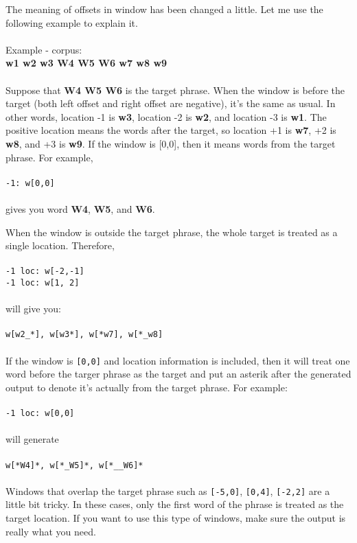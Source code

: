 \documentclass[11pt]{article}
\begin{document}
The meaning of offsets in window has been changed a little.  Let me use the 
following example to explain it. \\ \\
%
Example - corpus: \\ 
{\bf w1 w2 w3 W4 W5 W6 w7 w8 w9} \\ \\ 
%
Suppose that {\bf W4 W5 W6} is the target phrase.  When the window is before 
the target (both left offset and right offset are negative), it's the same as 
usual.  In other words, location -1 is {\bf w3}, location -2 is {\bf w2}, and 
location -3 is {\bf w1}.  The positive location means the words after the 
target, so location +1 is {\bf w7}, +2 is {\bf w8}, and +3 is {\bf w9}.  If the 
window is [0,0], then it means words from the target phrase.  For example, \\ \\
%
{\tt -1: w[0,0]} \\ \\
gives you word {\bf W4}, {\bf W5}, and {\bf W6}.  

When the window is outside the target phrase, the whole target is treated as a 
single location.  Therefore, \\ \\ 
%
{\tt -1 loc: w[-2,-1] \\
-1 loc: w[1, 2]} \\ \\ 
%
will give you: \\ \\
%
{\tt w[w2\_*], w[w3*], w[*w7], w[*\_w8]} \\ \\ 
%
If the window is {\tt [0,0]} and location information is included, then it will 
treat one word before the targer phrase as the target and put an asterik after 
the generated output to denote it's actually from the target phrase.  For 
example: \\ \\
%
{\tt -1 loc: w[0,0]} \\ \\ 
%
will generate  \\ \\ 
%
{\tt w[*W4]*, w[*\_W5]*, w[*\_\_W6]*} \\ \\
%
Windows that overlap the target phrase such as {\tt [-5,0]}, {\tt [0,4]}, 
{\tt [-2,2]} are a little bit tricky.  In these cases, only the first word of 
the phrase is treated as the target location.  If you want to use this type of 
windows, make sure the output is really what you need.
\end{document}
